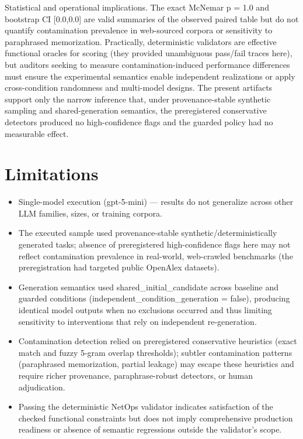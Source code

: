 \documentclass[conference]{IEEEtran}
\begin{document}
Statistical and operational implications. The exact McNemar p = 1.0 and bootstrap CI [0.0,0.0] are valid summaries of the observed paired table but do not quantify contamination prevalence in web-sourced corpora or sensitivity to paraphrased memorization. Practically, deterministic validators are effective functional oracles for scoring (they provided unambiguous pass/fail traces here), but auditors seeking to measure contamination-induced performance differences must ensure the experimental semantics enable independent realizations or apply cross-condition randomness and multi-model designs. The present artifacts support only the narrow inference that, under provenance-stable synthetic sampling and shared-generation semantics, the preregistered conservative detectors produced no high-confidence flags and the guarded policy had no measurable effect.

\section{Limitations}
\begin{itemize}
\item Single-model execution (gpt-5-mini) --- results do not generalize across other LLM families, sizes, or training corpora.
\item The executed sample used provenance-stable synthetic/deterministically generated tasks; absence of preregistered high-confidence flags here may not reflect contamination prevalence in real-world, web-crawled benchmarks (the preregistration had targeted public OpenAlex datasets).
\item Generation semantics used shared\_initial\_candidate across baseline and guarded conditions (independent\_condition\_generation = false), producing identical model outputs when no exclusions occurred and thus limiting sensitivity to interventions that rely on independent re-generation.
\item Contamination detection relied on preregistered conservative heuristics (exact match and fuzzy 5-gram overlap thresholds); subtler contamination patterns (paraphrased memorization, partial leakage) may escape these heuristics and require richer provenance, paraphrase-robust detectors, or human adjudication.
\item Passing the deterministic NetOps validator indicates satisfaction of the checked functional constraints but does not imply comprehensive production readiness or absence of semantic regressions outside the validator's scope.
\end{itemize}
\end{document}
